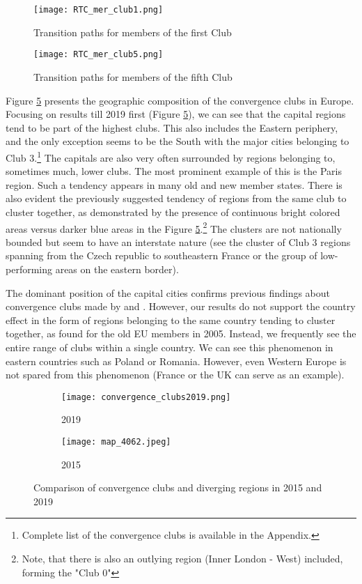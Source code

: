 \documentclass[11pt]{article}
\begin{document}
\begin{figure}[!htbp]%
    \centering
    \texttt{[image: RTC\_mer\_club1.png]}
    \caption{Transition paths for members of the first Club}
    \label{paths1}
\end{figure}

\begin{figure}[!htbp]%
    \centering
    \texttt{[image: RTC\_mer\_club5.png]}
    \caption{Transition paths for members of the fifth Club }
    \label{paths5}
\end{figure}


Figure \ref{clubs_graphic} presents the geographic composition of the convergence clubs in Europe. Focusing on results till 2019 first (Figure \ref{clubs_graphic}), we can see that the capital regions tend to be part of the highest clubs. This also includes the Eastern periphery, and the only exception seems to be the South with the major cities belonging to Club 3.\footnote{Complete list of the convergence clubs is available in the Appendix.} The capitals are also very often surrounded by regions belonging to, sometimes much, lower clubs. The most prominent example of this is the Paris region. Such a tendency appears in many old and new member states. There is also evident the previously suggested tendency of regions from the same club to cluster together, as demonstrated by the presence of continuous bright colored areas versus darker blue areas in the Figure \ref{clubs_graphic}.\footnote{Note, that there is also an outlying region (Inner London - West) included, forming the "Club 0"} The clusters are not nationally bounded but seem to have an interstate nature (see the cluster of Club 3 regions spanning from the Czech republic to southeastern France or the group of low-performing areas on the eastern border).


The dominant position of the capital cities confirms previous findings about convergence clubs made by \citet{sme2012regional} and \citet{bartkowska2012regional}. However, our results do not support the country effect in the form of regions belonging to the same country tending to cluster together, as \citet{bartkowska2012regional} found for the old EU members in 2005. Instead, we frequently see the entire range of clubs within a single country. We can see this phenomenon in eastern countries such as Poland or Romania. However,
even Western Europe is not spared from this phenomenon (France or the UK can serve as an example).


\begin{figure}[!htbp]%
\centering
\begin{subfigure}[c]{0.75\linewidth}
  {
  \texttt{[image: convergence\_clubs2019.png]}
    \caption{2019}
    \label{clubs_graphic_2019}
  }
\end{subfigure}
\qquad
\begin{subfigure}[c]{0.75\linewidth}
  \texttt{[image: map\_4062.jpeg]}
  \caption{2015}
  \label{clubs_graphic_2015}
\end{subfigure}
  \caption{Comparison of convergence clubs and diverging regions in 2015 and 2019}
\label{clubs_graphic}
\end{figure} 
\end{document}
